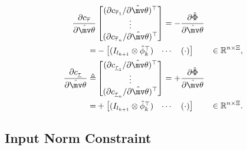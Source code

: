 \documentclass[lettersize,journal]{IEEEtran}
\newcommand*{\wth}{\mv\theta}
\begin{document}
\begin{equation}
    \begin{aligned}
        {\partial \mathbf \mathbf c_{\overline \tau} \over \partial \hat\wth}
        & 
        \begin{bmatrix}
            (\partial c_{\overline \tau_1}/\partial \hat\wth)^\top \\
            \vdots \\
            (\partial c_{\overline \tau_n}/\partial \hat\wth)^\top
        \end{bmatrix}
         = -{\partial \hat\Phi\over\partial\hat\wth}
         \\
        =&
        -\begin{bmatrix}
            (I_{l_{k+1}}\otimes \hat\phi_{k}^\top)&
            \cdots &
            (
            \cdot
            )
        \end{bmatrix} 
        &
        \in
        \mathbb R^{n\times \Xi}
        , 
        \\
        {\partial \mathbf \mathbf c_{\underline\tau} \over \partial \hat\wth}         
        \triangleq
        & 
        \begin{bmatrix}
            (\partial c_{\underline\tau_1}/\partial \hat\wth)^\top \\
            \vdots \\
            (\partial c_{\underline\tau_n}/\partial \hat\wth)^\top
        \end{bmatrix}
        = +{\partial \hat\Phi\over\partial\hat\wth}
        \\
        =&
        +\begin{bmatrix}
            (I_{l_{k+1}}\otimes \hat\phi_{k}^\top)&
            \cdots &
            (
            \cdot
            )
        \end{bmatrix} 
        &
        \in
        \mathbb R^{n\times \Xi}
        .
    \end{aligned}
    \label{eq. nabla input sat}
\end{equation}

\subsection{Input Norm Constraint}\label{sec:input_norm_cnst}
\end{document}
